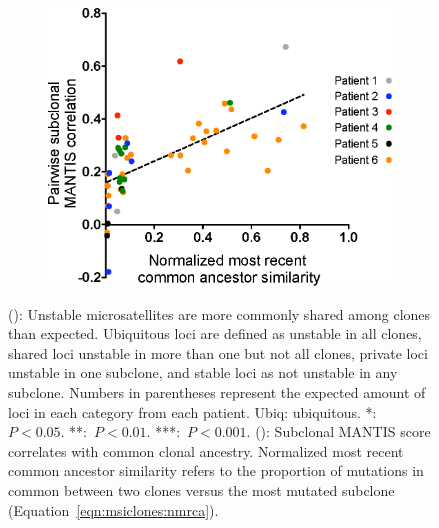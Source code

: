 \begin{figure}[ht]
\begin{minipage}[b]{0.5\textwidth}
\begin{subfigure}{\textwidth}
			\includegraphics[width=0.98\linewidth]{images/msiclones/mrca_mantis_corr}
			\caption{}\label{fig:msiclones:mrca_corr_plot}
		\end{subfigure}
	\end{minipage}
	\vspace{-0.25cm}
	\caption[Unstable microsatellites reflect subclonal ancestry.]{(): Unstable microsatellites are more commonly shared among clones than expected. Ubiquitous loci are defined as unstable in all clones, shared loci unstable in more than one but not all clones, private loci unstable in one subclone, and stable loci as not unstable in any subclone. Numbers in parentheses represent the expected amount of loci in each category from each patient. Ubiq: ubiquitous. *:~$P < 0.05$. **:~$P < 0.01$. ***:~$P < 0.001$. (): Subclonal MANTIS score correlates with common clonal ancestry. Normalized most recent common ancestor similarity refers to the proportion of mutations in common between two clones versus the most mutated subclone (Equation~\ref{eqn:msiclones:nmrca}).}
	\label{fig:msiclones:mrca_corr}
\end{figure}

